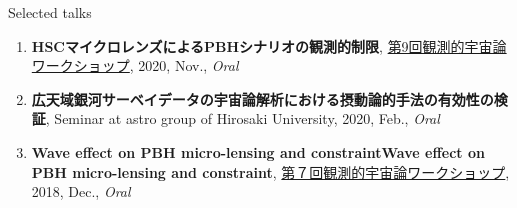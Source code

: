 \begin{rSection}{Selected talks}
\begin{enumerate}
\item \textbf{HSCマイクロレンズによるPBHシナリオの観測的制限}, \href{https://indico.ipmu.jp/event/382/timetable/#all}{第9回観測的宇宙論ワークショップ}, 2020, Nov., \textit{Oral}
\item \textbf{広天域銀河サーベイデータの宇宙論解析における摂動論的手法の有効性の検証}, Seminar at astro group of Hirosaki University, 2020, Feb., \textit{Oral}
\item \textbf{Wave effect on PBH micro-lensing and constraintWave effect on PBH micro-lensing and constraint}, \href{http://web.cc.yamaguchi-u.ac.jp/~rsaito/obscosmo2018/}{第７回観測的宇宙論ワークショップ}, 2018, Dec., \textit{Oral}
\end{enumerate}\end{rSection}
